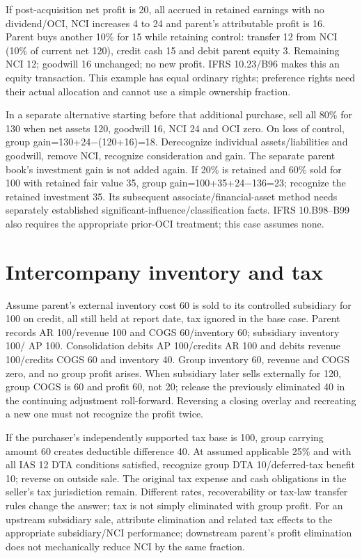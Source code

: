 If post-acquisition net profit is 20, all accrued in retained earnings with no dividend/OCI, NCI increases 4 to 24 and parent's attributable profit is 16. Parent buys another 10\% for 15 while retaining control: transfer 12 from NCI (10\% of current net 120), credit cash 15 and debit parent equity 3. Remaining NCI 12; goodwill 16 unchanged; no new profit. IFRS 10.23/B96 makes this an equity transaction. This example has equal ordinary rights; preference rights need their actual allocation and cannot use a simple ownership fraction.

In a separate alternative starting before that additional purchase, sell all 80\% for 130 when net assets 120, goodwill 16, NCI 24 and OCI zero. On loss of control, group gain=130+24\ensuremath{-}(120+16)=18. Derecognize individual assets/liabilities and goodwill, remove NCI, recognize consideration and gain. The separate parent book's investment gain is not added again. If 20\% is retained and 60\% sold for 100 with retained fair value 35, group gain=100+35+24\ensuremath{-}136=23; recognize the retained investment 35. Its subsequent associate/financial-asset method needs separately established significant-influence/classification facts. IFRS 10.B98--B99 also requires the appropriate prior-OCI treatment; this case assumes none.

\hypertarget{intercompany-inventory-and-tax}{%
\section{Intercompany inventory and tax}\label{method-groups-fx-methods-intercompany-inventory-and-tax}}

Assume parent's external inventory cost 60 is sold to its controlled subsidiary for 100 on credit, all still held at report date, tax ignored in the base case. Parent records AR 100/revenue 100 and COGS 60/inventory 60; subsidiary inventory 100/ AP 100. Consolidation debits AP 100/credits AR 100 and debits revenue 100/credits COGS 60 and inventory 40. Group inventory 60, revenue and COGS zero, and no group profit arises. When subsidiary later sells externally for 120, group COGS is 60 and profit 60, not 20; release the previously eliminated 40 in the continuing adjustment roll-forward. Reversing a closing overlay and recreating a new one must not recognize the profit twice.

If the purchaser's independently supported tax base is 100, group carrying amount 60 creates deductible difference 40. At assumed applicable 25\% and with all IAS 12 DTA conditions satisfied, recognize group DTA 10/deferred-tax benefit 10; reverse on outside sale. The original tax expense and cash obligations in the seller's tax jurisdiction remain. Different rates, recoverability or tax-law transfer rules change the answer; tax is not simply eliminated with group profit. For an upstream subsidiary sale, attribute elimination and related tax effects to the appropriate subsidiary/NCI performance; downstream parent's profit elimination does not mechanically reduce NCI by the same fraction.

